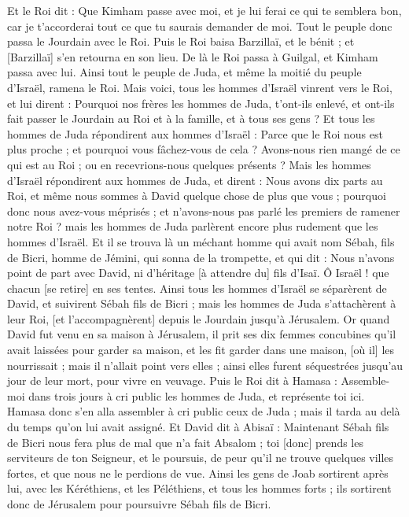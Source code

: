 \begin{multicols}{2}
Et le Roi dit : Que Kimham passe avec moi, et je lui ferai ce qui te semblera bon, car je t'accorderai tout ce que tu saurais demander de moi.
Tout le peuple donc passa le Jourdain avec le Roi. Puis le Roi baisa Barzillaï, et le bénit ; et [Barzillaï] s'en retourna en son lieu.
De là le Roi passa à Guilgal, et Kimham passa avec lui. Ainsi tout le peuple de Juda, et même la moitié du peuple d'Israël, ramena le Roi.
Mais voici, tous les hommes d'Israël vinrent vers le Roi, et lui dirent : Pourquoi nos frères les hommes de Juda, t'ont-ils enlevé, et ont-ils fait passer le Jourdain au Roi et à la famille, et à tous ses gens ?
Et tous les hommes de Juda répondirent aux hommes d'Israël : Parce que le Roi nous est plus proche ; et pourquoi vous fâchez-vous de cela ? Avons-nous rien mangé de ce qui est au Roi ; ou en recevrions-nous quelques présents ?
Mais les hommes d'Israël répondirent aux hommes de Juda, et dirent : Nous avons dix parts au Roi, et même nous sommes à David quelque chose de plus que vous ; pourquoi donc nous avez-vous méprisés ; et n'avons-nous pas parlé les premiers de ramener notre Roi ? mais les hommes de Juda parlèrent encore plus rudement que les hommes d'Israël.
\VerseOne{}Et il se trouva là un méchant homme qui avait nom Sébah, fils de Bicri, homme de Jémini, qui sonna de la trompette, et qui dit : Nous n'avons point de part avec David, ni d'héritage [à attendre du] fils d'Isaï. Ô Israël ! que chacun [se retire] en ses tentes.
Ainsi tous les hommes d'Israël se séparèrent de David, et suivirent Sébah fils de Bicri ; mais les hommes de Juda s'attachèrent à leur Roi, [et l'accompagnèrent] depuis le Jourdain jusqu'à Jérusalem.
Or quand David fut venu en sa maison à Jérusalem, il prit ses dix femmes concubines qu'il avait laissées pour garder sa maison, et les fit garder dans une maison, [où il] les nourrissait ; mais il n'allait point vers elles ; ainsi elles furent séquestrées jusqu'au jour de leur mort, pour vivre en veuvage.
Puis le Roi dit à Hamasa : Assemble-moi dans trois jours à cri public les hommes de Juda, et représente toi ici.
Hamasa donc s'en alla assembler à cri public ceux de Juda ; mais il tarda au delà du temps qu'on lui avait assigné.
Et David dit à Abisaï : Maintenant Sébah fils de Bicri nous fera plus de mal que n'a fait Absalom ; toi [donc] prends les serviteurs de ton Seigneur, et le poursuis, de peur qu'il ne trouve quelques villes fortes, et que nous ne le perdions de vue.
Ainsi les gens de Joab sortirent après lui, avec les Kéréthiens, et les Péléthiens, et tous les hommes forts ; ils sortirent donc de Jérusalem pour poursuivre Sébah fils de Bicri.

\end{multicols}
